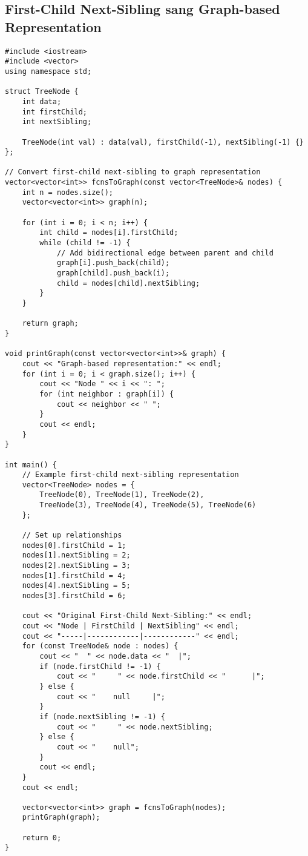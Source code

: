 \documentclass[12pt]{article}
\begin{document}
\subsection{First-Child Next-Sibling sang Graph-based Representation}

\begin{lstlisting}[caption={Chuyển đổi từ First-Child Next-Sibling sang Graph-based Representation}]
#include <iostream>
#include <vector>
using namespace std;

struct TreeNode {
    int data;
    int firstChild;
    int nextSibling;
    
    TreeNode(int val) : data(val), firstChild(-1), nextSibling(-1) {}
};

// Convert first-child next-sibling to graph representation
vector<vector<int>> fcnsToGraph(const vector<TreeNode>& nodes) {
    int n = nodes.size();
    vector<vector<int>> graph(n);
    
    for (int i = 0; i < n; i++) {
        int child = nodes[i].firstChild;
        while (child != -1) {
            // Add bidirectional edge between parent and child
            graph[i].push_back(child);
            graph[child].push_back(i);
            child = nodes[child].nextSibling;
        }
    }
    
    return graph;
}

void printGraph(const vector<vector<int>>& graph) {
    cout << "Graph-based representation:" << endl;
    for (int i = 0; i < graph.size(); i++) {
        cout << "Node " << i << ": ";
        for (int neighbor : graph[i]) {
            cout << neighbor << " ";
        }
        cout << endl;
    }
}

int main() {
    // Example first-child next-sibling representation
    vector<TreeNode> nodes = {
        TreeNode(0), TreeNode(1), TreeNode(2), 
        TreeNode(3), TreeNode(4), TreeNode(5), TreeNode(6)
    };
    
    // Set up relationships
    nodes[0].firstChild = 1;
    nodes[1].nextSibling = 2;
    nodes[2].nextSibling = 3;
    nodes[1].firstChild = 4;
    nodes[4].nextSibling = 5;
    nodes[3].firstChild = 6;
    
    cout << "Original First-Child Next-Sibling:" << endl;
    cout << "Node | FirstChild | NextSibling" << endl;
    cout << "-----|------------|------------" << endl;
    for (const TreeNode& node : nodes) {
        cout << "  " << node.data << "  |";
        if (node.firstChild != -1) {
            cout << "     " << node.firstChild << "      |";
        } else {
            cout << "    null     |";
        }
        if (node.nextSibling != -1) {
            cout << "     " << node.nextSibling;
        } else {
            cout << "    null";
        }
        cout << endl;
    }
    cout << endl;
    
    vector<vector<int>> graph = fcnsToGraph(nodes);
    printGraph(graph);
    
    return 0;
}
\end{lstlisting}
\end{document}
